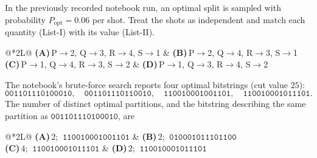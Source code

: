 \documentclass[11pt,a4paper]{article}
\newcommand{\optlabel}[1]{\textbf{(#1)}}
\newenvironment{qitem}[1]{\begin{list}{}{\setlength{\leftmargin}{3.3em}\setlength{\labelwidth}{3.1em}%
  \setlength{\labelsep}{0.2em}\setlength{\topsep}{3pt}\setlength{\parsep}{3pt}}\item[\textbf{Q.#1}\hfill]}{\end{list}}
\newcommand{\qsep}{\par\vspace{2pt}{\color{black!15}\hrule}\vspace{4pt}}
\begin{document}
\begin{qitem}{13}
In the previously recorded notebook run, an optimal split is sampled with probability $P_{\text{opt}} = 0.06$ per
shot. Treat the shots as independent and match each quantity (List-I) with its value (List-II).
\par\smallskip{}
\par\smallskip\noindent\begin{tabularx}{\linewidth}{@{}*{2}{L}@{}}
\optlabel{A}\,P$\to$2, Q$\to$3, R$\to$4, S$\to$1 & \optlabel{B}\,P$\to$2, Q$\to$4, R$\to$3, S$\to$1 \\[3pt]
\optlabel{C}\,P$\to$1, Q$\to$4, R$\to$3, S$\to$2 & \optlabel{D}\,P$\to$1, Q$\to$3, R$\to$4, S$\to$2
\end{tabularx}
\end{qitem}
\qsep

\begin{qitem}{14}
The notebook's brute-force search reports four optimal bitstrings (cut value $25$):
\[ \texttt{001101110100010},\quad \texttt{001101110110010},\quad \texttt{110010001001101},\quad \texttt{110010001011101}. \]
The number of distinct optimal partitions, and the bitstring describing the same partition as $\texttt{001101110100010}$, are
\par\smallskip\noindent\begin{tabularx}{\linewidth}{@{}*{2}{L}@{}}
\optlabel{A}\,$2$; $\ \texttt{110010001001101}$ & \optlabel{B}\,$2$; $\ \texttt{010001011101100}$ \\[3pt]
\optlabel{C}\,$4$; $\ \texttt{110010001011101}$ & \optlabel{D}\,$2$; $\ \texttt{110010001011101}$
\end{tabularx}
\end{qitem}
\qsep
\end{document}
